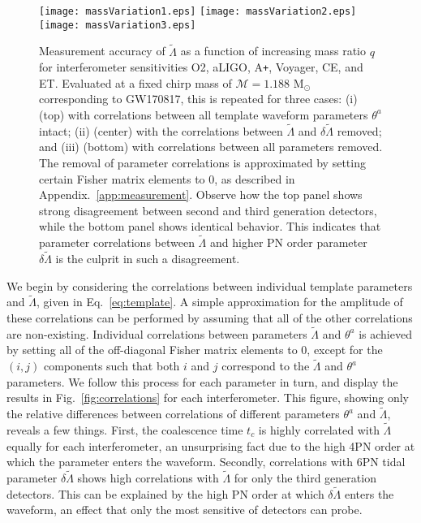 \documentclass[prd,twocolumn,nofootinbib,superscriptaddress,amsmath,amssymb]{revtex4-1}
\begin{document}
\begin{figure}
\begin{center} 
\texttt{[image: massVariation1.eps]}
\texttt{[image: massVariation2.eps]}
\texttt{[image: massVariation3.eps]}
\end{center}
\caption{
Measurement accuracy of $\tilde\Lambda$ as a function of increasing mass ratio $q$ for interferometer sensitivities O2, aLIGO, A\texttt{+}, Voyager, CE, and ET.
Evaluated at a fixed chirp mass of $\mathcal{M}=1.188\text{ M}_{\odot}$ corresponding to GW170817, this is repeated for three cases: (i) (top) with correlations between all template waveform parameters $\theta^a$ intact; (ii) (center) with the correlations between $\tilde\Lambda$ and $\delta\tilde\Lambda$ removed; and (iii) (bottom) with correlations between all parameters removed.
The removal of parameter correlations is approximated by setting certain Fisher matrix elements to 0, as described in Appendix.~\ref{app:measurement}.
Observe how the top panel shows strong disagreement between second and third generation detectors, while the bottom panel shows identical behavior.
This indicates that parameter correlations between $\tilde\Lambda$ and higher PN order parameter $\delta\tilde\Lambda$ is the culprit in such a disagreement.
}
\label{fig:massVariation}
\end{figure} 

We begin by considering the correlations between individual template parameters and $\tilde\Lambda$, given in Eq.~\ref{eq:template}.
A simple approximation for the amplitude of these correlations can be performed by assuming that all of the other correlations are non-existing.
Individual correlations between parameters $\tilde\Lambda$ and $\theta^a$ is achieved by setting all of the off-diagonal Fisher matrix elements to $0$, except for the $(i,j)$ components such that both $i$ and $j$ correspond to the $\tilde\Lambda$ and $\theta^a$ parameters.
We follow this process for each parameter in turn, and display the results in Fig.~\ref{fig:correlations} for each interferometer.
This figure, showing only the relative differences between correlations of different parameters $\theta^a$ and $\tilde\Lambda$, reveals a few things.
First, the coalescence time $t_c$ is highly correlated with $\tilde\Lambda$ equally for each interferometer, an unsurprising fact due to the high 4PN order at which the parameter enters the waveform.
Secondly, correlations with 6PN tidal parameter $\delta\tilde\Lambda$ shows high correlations with $\tilde\Lambda$ for only the third generation detectors.
This can be explained by the high PN order at which $\delta\tilde\Lambda$ enters the waveform, an effect that only the most sensitive of detectors can probe. 
\end{document}
